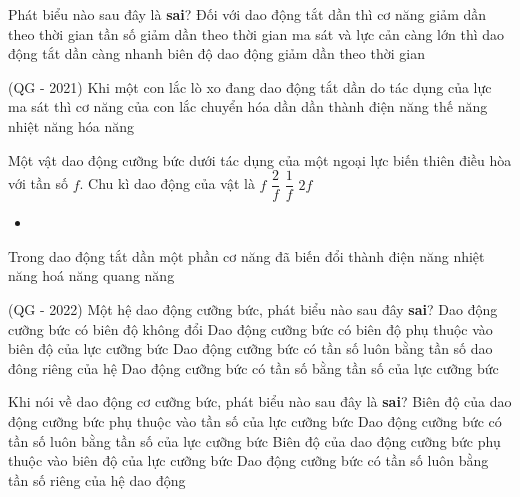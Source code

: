 \begin{ex}%
Phát biểu nào sau đây là \textbf{sai}? Đối với dao động tắt dần thì
\choice
{cơ năng giảm dần theo thời gian}
{\True tần số giảm dần theo thời gian}
{ma sát và lực cản càng lớn thì dao động tắt dần càng nhanh}
{biên độ dao động giảm dần theo thời gian}
\end{ex} 
\begin{ex}
(QG - 2021) Khi một con lắc lò xo đang dao động tắt dần do tác dụng của lực ma sát thì cơ năng của con lắc chuyển hóa dần dần thành
\choice
{điện năng}
{thế năng}
{\True nhiệt năng}
{hóa năng}
\end{ex} 
\begin{ex}%
Một vật dao động cưỡng bức dưới tác dụng của một ngoại lực biến thiên điều hòa với tần số $f$. Chu kì dao động của vật là
\choice
{$f$}
{$\dfrac{2}{f}$}
{\True $\dfrac{1}{f}$}
{$2f$}
\end{ex} 
\begin{itemize}
\item[]
\end{itemize}
\begin{ex}
Trong dao động tắt dần một phần cơ năng đã biến đổi thành
\choice
{điện năng}
{\True nhiệt năng}
{hoá năng}
{quang năng}
\end{ex} 
\begin{ex} 
(QG - 2022) Một hệ dao động cưỡng bức, phát biểu nào sau đây \textbf{sai}?
\choice
{Dao động cưỡng bức có biên độ không đổi}
{Dao động cưỡng bức có biên độ phụ thuộc vào biên độ của lực cưỡng bức}
{\True Dao động cưỡng bức có tần số luôn bằng tần số dao đông riêng của hệ}
{Dao động cưỡng bức có tần số bằng tần số của lực cưỡng bức}
\end{ex} 
\begin{ex}%
Khi nói về dao động cơ cưỡng bức, phát biểu nào sau đây là \textbf{sai}?
\choice
{Biên độ của dao động cưỡng bức phụ thuộc vào tần số của lực cưỡng bức}
{Dao động cưỡng bức có tần số luôn bằng tần số của lực cưỡng bức}
{Biên độ của dao động cưỡng bức phụ thuộc vào biên độ của lực cưỡng bức}
{\True Dao động cưỡng bức có tần số luôn bằng tần số riêng của hệ dao động}
\end{ex} 
